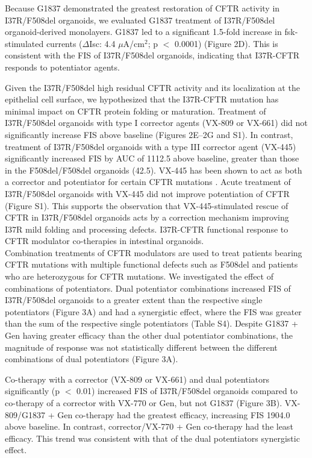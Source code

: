 Because G1837 demonstrated the greatest restoration of CFTR activity in I37R/F508del organoids, we evaluated G1837 treatment of I37R/F508del organoid-derived monolayers. G1837 led to a significant 1.5-fold increase in fsk-stimulated currents ($\Delta$Isc: 4.4 $\mu$A/cm$^2$; p $<$ 0.0001) (Figure 2D). This is consistent with the FIS of I37R/F508del organoids, indicating that I37R-CFTR responds to potentiator agents.

Given the I37R/F508del high residual CFTR activity and its localization at the epithelial cell surface, we hypothesized that the I37R-CFTR mutation has minimal impact on CFTR protein folding or maturation. Treatment of I37R/F508del organoids with type I corrector agents (VX-809 or VX-661) did not significantly increase FIS above baseline (Figures 2E–2G and S1). In contrast, treatment of I37R/F508del organoids with a type III corrector agent (VX-445) significantly increased FIS by AUC of 1112.5 above baseline, greater than those in the F508del/F508del organoids (42.5). VX-445 has been shown to act as both a corrector and potentiator for certain CFTR mutations \cite{laselva2021,shaughnessy2021,veit2021}. Acute treatment of I37R/F508del organoids with VX-445 did not improve potentiation of CFTR (Figure S1). This supports the observation that VX-445-stimulated rescue of CFTR in I37R/F508del organoids acts by a correction mechanism improving I37R mild folding and processing defects. I37R-CFTR functional response to CFTR modulator co-therapies in intestinal organoids.\\

Combination treatments of CFTR modulators are used to treat patients bearing CFTR mutations with multiple functional defects such as F508del and patients who are heterozygous for CFTR mutations. We investigated the effect of combinations of potentiators. Dual potentiator combinations increased FIS of I37R/F508del organoids to a greater extent than the respective single potentiators (Figure 3A) and had a synergistic effect, where the FIS was greater than the sum of the respective single potentiators (Table S4). Despite G1837 + Gen having greater efficacy than the other dual potentiator combinations, the magnitude of response was not statistically different between the different combinations of dual potentiators (Figure 3A).

Co-therapy with a corrector (VX-809 or VX-661) and dual potentiators significantly (p $<$ 0.01) increased FIS of I37R/F508del organoids compared to co-therapy of a corrector with VX-770 or Gen, but not G1837 (Figure 3B). VX-809/G1837 + Gen co-therapy had the greatest efficacy, increasing FIS 1904.0 above baseline. In contrast, corrector/VX-770 + Gen co-therapy had the least efficacy. This trend was consistent with that of the dual potentiators synergistic effect.

